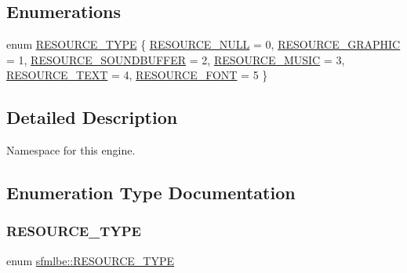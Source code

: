 \subsection*{Enumerations}
\begin{DoxyCompactItemize}
\item 
enum \mbox{\hyperlink{namespacesfmlbe_ac4335ed3060bba025f73e01f9dccb2dd}{R\+E\+S\+O\+U\+R\+C\+E\+\_\+\+T\+Y\+PE}} \{ \newline
\mbox{\hyperlink{namespacesfmlbe_ac4335ed3060bba025f73e01f9dccb2dda8d19259bccf0ab6ee075b32fff6f7e54}{R\+E\+S\+O\+U\+R\+C\+E\+\_\+\+N\+U\+LL}} = 0, 
\mbox{\hyperlink{namespacesfmlbe_ac4335ed3060bba025f73e01f9dccb2dda660c8cdfebf28528f6f0631ae29f89a5}{R\+E\+S\+O\+U\+R\+C\+E\+\_\+\+G\+R\+A\+P\+H\+IC}} = 1, 
\mbox{\hyperlink{namespacesfmlbe_ac4335ed3060bba025f73e01f9dccb2dda06cb8047cf98a2679b83166ad27d2708}{R\+E\+S\+O\+U\+R\+C\+E\+\_\+\+S\+O\+U\+N\+D\+B\+U\+F\+F\+ER}} = 2, 
\mbox{\hyperlink{namespacesfmlbe_ac4335ed3060bba025f73e01f9dccb2ddab44bcfdfdfd1fd38857b8ad914608007}{R\+E\+S\+O\+U\+R\+C\+E\+\_\+\+M\+U\+S\+IC}} = 3, 
\newline
\mbox{\hyperlink{namespacesfmlbe_ac4335ed3060bba025f73e01f9dccb2dda9550a304907119d426805e6ed9a6c193}{R\+E\+S\+O\+U\+R\+C\+E\+\_\+\+T\+E\+XT}} = 4, 
\mbox{\hyperlink{namespacesfmlbe_ac4335ed3060bba025f73e01f9dccb2dda7eae53eb53c90d3adcdfa9a16ebc34b7}{R\+E\+S\+O\+U\+R\+C\+E\+\_\+\+F\+O\+NT}} = 5
 \}
\end{DoxyCompactItemize}


\subsection{Detailed Description}
Namespace for this engine. 

\subsection{Enumeration Type Documentation}
\mbox{\label{namespacesfmlbe_ac4335ed3060bba025f73e01f9dccb2dd}} 
\subsubsection{\texorpdfstring{R\+E\+S\+O\+U\+R\+C\+E\+\_\+\+T\+Y\+PE}{RESOURCE\_TYPE}}
{\footnotesize\ttfamily enum \mbox{\hyperlink{namespacesfmlbe_ac4335ed3060bba025f73e01f9dccb2dd}{sfmlbe\+::\+R\+E\+S\+O\+U\+R\+C\+E\+\_\+\+T\+Y\+PE}}}


